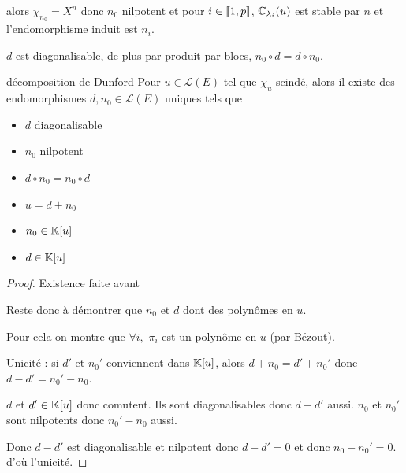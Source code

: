 alors $\chi_{n_0} = X^n$ donc $n_0$ nilpotent et pour $i \in [\![1, p]\!]$, 
$\mathbb{C}_{\lambda_i}(u)$ est stable par $n$ et l'endomorphisme induit est 
$n_i$. 

$d$ est diagonalisable, de plus par produit par blocs, 
$n_0 \circ d = d \circ n_0$. 



\begin{theoreme}{décomposition de Dunford}{}
    Pour $u \in \mathscr L(E)$ tel que $\chi_u$ scindé, alors il existe des endomorphismes 
    $d, n_0 \in \mathscr L(E)$ uniques tels que 
    \begin{itemize}
        \item $d$ diagonalisable
        \item $n_0$ nilpotent
        \item $d \circ n_0 = n_0 \circ d$
        \item $u = d + n_0$
        \item $n_0 \in \mathbb{K}[u]$
        \item $d \in \mathbb{K}[u]$
    \end{itemize}
\end{theoreme}

\begin{proof}
    Existence faite avant 

    Reste donc à démontrer que $n_0$ et $d$ dont des polynômes en $u$.

    Pour cela on montre que $\forall i, $ $\pi_i$ est un polynôme en $u$ 
    (par Bézout). 

    \avspace Unicité : si $d'$ et $n_0'$ conviennent dans $\mathbb{K}[u]$, alors 
    $d + n_0 = d' + n_0'$ donc $d - d' = n_0' - n_0$.

    $d$ et $d' \in \mathbb{K}[u]$ donc comutent. Ils sont diagonalisables donc $d - d'$ aussi.
    $n_0$ et $n_0'$ sont nilpotents donc $n_0' - n_0$ aussi.

    Donc $d - d'$ est diagonalisable et nilpotent donc $d - d' = 0$ et donc $n_0 - n_0' = 0$.
    d'où l'unicité.
\end{proof}

